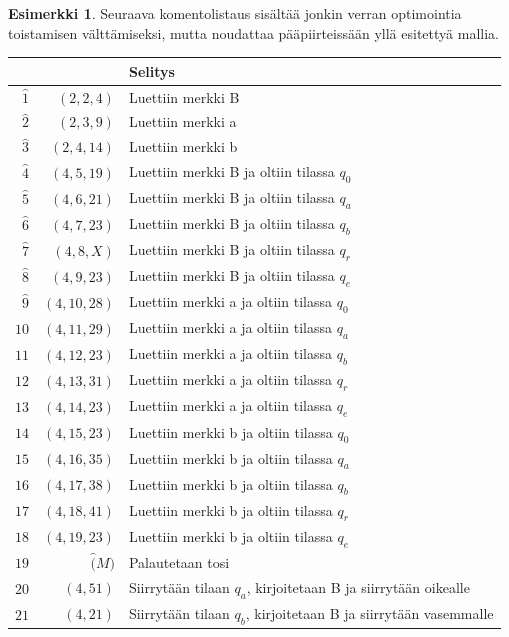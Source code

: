 \documentclass[a4paper, 12pt]{article}
\theoremstyle{definition}
\newtheorem{example}[mydef]{Esimerkki}
\theoremstyle{plain}
\begin{document}
\begin{example}
Seuraava komentolistaus sisältää jonkin verran optimointia toistamisen välttämiseksi, mutta noudattaa pääpiirteissään yllä esitettyä mallia.
\\
\begin{tabular}[t]{r|r|l}
& & Selitys\\
\hline
$\hat{1}$ & $(2, 2, 4)$  & Luettiin merkki B \\
$\hat{2}$ & $(2, 3, 9)$  & Luettiin merkki a \\
$\hat{3}$ & $(2, 4, 14)$  & Luettiin merkki b \\
$\hat{4}$ & $(4, 5, 19)$  & Luettiin merkki B ja oltiin tilassa $q_0$ \\
$\hat{5}$ & $(4, 6, 21)$  & Luettiin merkki B ja oltiin tilassa $q_a$ \\
$\hat{6}$ & $(4, 7, 23)$  & Luettiin merkki B ja oltiin tilassa $q_b$ \\
$\hat{7}$ & $(4, 8, X)$  & Luettiin merkki B ja oltiin tilassa $q_r$ \\
$\hat{8}$ & $(4, 9, 23)$  & Luettiin merkki B ja oltiin tilassa $q_e$ \\
$\hat{9}$ & $(4, 10, 28)$  & Luettiin merkki a ja oltiin tilassa $q_0$ \\
$\hat{10}$ & $(4, 11, 29)$  & Luettiin merkki a ja oltiin tilassa $q_a$ \\
$\hat{11}$ & $(4, 12, 23)$  & Luettiin merkki a ja oltiin tilassa $q_b$ \\
$\hat{12}$ & $(4, 13, 31)$  & Luettiin merkki a ja oltiin tilassa $q_r$ \\
$\hat{13}$ & $(4, 14, 23)$  & Luettiin merkki a ja oltiin tilassa $q_e$ \\
$\hat{14}$ & $(4, 15, 23)$  & Luettiin merkki b ja oltiin tilassa $q_0$ \\
$\hat{15}$ & $(4, 16, 35)$  & Luettiin merkki b ja oltiin tilassa $q_a$ \\
$\hat{16}$ & $(4, 17, 38)$  & Luettiin merkki b ja oltiin tilassa $q_b$ \\
$\hat{17}$ & $(4, 18, 41)$  & Luettiin merkki b ja oltiin tilassa $q_r$ \\
$\hat{18}$ & $(4, 19, 23)$  & Luettiin merkki b ja oltiin tilassa $q_e$ \\
$\hat{19}$ & $\hat(M)$  & Palautetaan tosi \\
$\hat{20}$ & $(4, 51)$  & Siirrytään tilaan $q_a$, kirjoitetaan B ja siirrytään oikealle\\
$\hat{21}$ & $(4, 21)$  & Siirrytään tilaan $q_b$, kirjoitetaan B ja siirrytään vasemmalle\\

\end{tabular}
\end{example}
\end{document}
